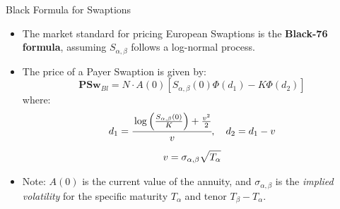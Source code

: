 \documentclass{beamer}
\begin{document}

\begin{frame}{Black Formula for Swaptions}
	\begin{itemize}
		\item The market standard for pricing European Swaptions is the \textbf{Black-76 formula}, assuming $S_{\alpha,\beta}$ follows a log-normal process.
		\item The price of a Payer Swaption is given by:
		\begin{equation}
			\boxed{\textbf{PSw}_{Bl} = N \cdot A(0) \left[ S_{\alpha,\beta}(0)\Phi(d_1) - K\Phi(d_2) \right]}
		\end{equation}
		where:
		\begin{equation*}
			\begin{gathered}
				d_{1} = \cfrac{\log\left(\frac{S_{\alpha,\beta}(0)}{K}\right) + \frac{v^2}{2}}{v}, \quad d_2 = d_1 - v \\[0.2cm]
				v = \sigma_{\alpha,\beta}\sqrt{T_\alpha}
			\end{gathered}
		\end{equation*}
		\item Note: $A(0)$ is the current value of the annuity, and $\sigma_{\alpha,\beta}$ is the \emph{implied volatility} for the specific maturity $T_\alpha$ and tenor $T_\beta - T_\alpha$.
	\end{itemize}
\end{frame}
\end{document}
